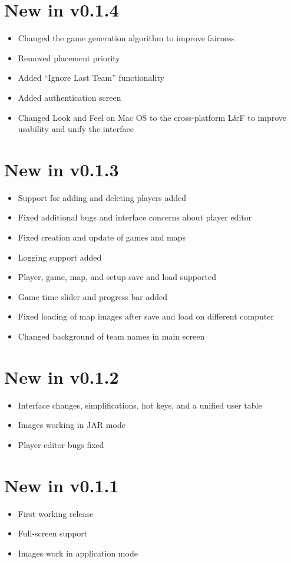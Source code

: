 \documentclass[10pt,a4paper]{report}
\begin{document}
\section{New in v0.1.4}
\begin{itemize}
\item Changed the game generation algorithm to improve fairness
\item Removed placement priority
\item Added ``Ignore Last Team'' functionality
\item Added authentication screen
\item Changed Look and Feel on Mac OS to the cross-platform L\&F to improve usability and unify the interface
\end{itemize}
\section{New in v0.1.3}
\begin{itemize}
\item Support for adding and deleting players added
\item Fixed additional bugs and interface concerns about player editor
\item Fixed creation and update of games and maps
\item Logging support added
\item Player, game, map, and setup save and load supported
\item Game time slider and progress bar added
\item Fixed loading of map images after save and load on different computer
\item Changed background of team names in main screen
\end{itemize}
\section{New in v0.1.2}
\begin{itemize}
\item Interface changes, simplifications, hot keys, and a unified user table
\item Images working in JAR mode
\item Player editor bugs fixed
\end{itemize}
\section{New in v0.1.1}
\begin{itemize}
\item First working release
\item Full-screen support
\item Images work in application mode
\end{itemize}
\end{document}
